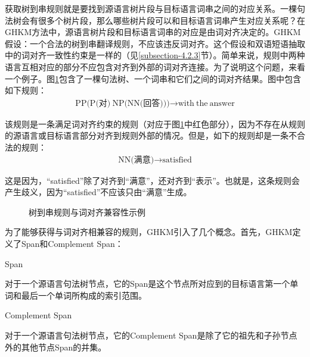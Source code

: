 \parinterval 获取树到串规则就是要找到源语言树片段与目标语言词串之间的对应关系。一棵句法树会有很多个树片段，那么哪些树片段可以和目标语言词串产生对应关系呢？在GHKM方法中，源语言树片段和目标语言词串的对应是由词对齐决定的。GHKM假设：一个合法的树到串翻译规则，不应该违反词对齐。这个假设和双语短语抽取中的词对齐一致性约束是一样的（见\ref{subsection-4.2.3}节）。简单来说，规则中两种语言互相对应的部分不应包含对齐到外部的词对齐连接。为了说明这个问题，来看一个例子。图\ref{fig:4-50}包含了一棵句法树、一个词串和它们之间的词对齐结果。图中包含如下规则：
\begin{eqnarray}
\textrm{PP(P(对)}\ \textrm{NP(NN(回答)))} \rightarrow \textrm{with}\ \textrm{the}\ \textrm{answer} \nonumber
\end{eqnarray}

\parinterval 该规则是一条满足词对齐约束的规则（对应于图\ref{fig:4-50}中红色部分），因为不存在从规则的源语言或目标语言部分对齐到规则外部的情况。但是，如下的规则却是一条不合法的规则：
\begin{eqnarray}
\textrm{NN(满意)} \rightarrow \textrm{satisfied} \nonumber
\end{eqnarray}

\parinterval 这是因为，``satisfied''除了对齐到``满意''，还对齐到``表示''。也就是，这条规则会产生歧义，因为``satisfied''不应该只由``满意''生成。

\begin{figure}[htp]
\centering

\caption{树到串规则与词对齐兼容性示例}
\label{fig:4-50}
\end{figure}

\parinterval 为了能够获得与词对齐相兼容的规则，GHKM引入了几个概念。首先，GHKM定义了Span和Complement Span：

\vspace{0.5em}
\begin{definition} Span

{\small
对于一个源语言句法树节点，它的Span是这个节点所对应到的目标语言第一个单词和最后一个单词所构成的索引范围。
}
\end{definition}

\vspace{0.5em}
\begin{definition} Complement Span

{\small
对于一个源语言句法树节点，它的Complement Span是除了它的祖先和子孙节点外的其他节点Span的并集。
}
\end{definition}

